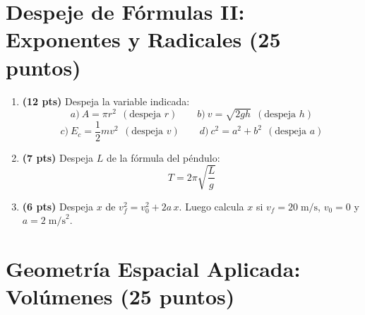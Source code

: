 \documentclass[12pt, letterpaper]{article}
\begin{document}
\newpage

\section{Despeje de Fórmulas II: Exponentes y Radicales (25 puntos)}

\begin{enumerate}[leftmargin=*]
  \item \textbf{(12 pts)} Despeja la variable indicada:
        \[
          a)\ A = \pi r^2 \ \ (\text{despeja } r) \qquad
          b)\ v = \sqrt{2gh} \ \ (\text{despeja } h)
        \]
        \[
          c)\ E_c = \frac{1}{2}mv^2 \ \ (\text{despeja } v) \qquad
          d)\ c^2 = a^2 + b^2 \ \ (\text{despeja } a)
        \]

  \item \textbf{(7 pts)} Despeja $L$ de la fórmula del péndulo:
        \[
          T = 2\pi\sqrt{\frac{L}{g}}
        \]

  \item \textbf{(6 pts)} Despeja $x$ de $v_f^2 = v_0^2 + 2a\,x$. Luego calcula $x$ si $v_f = 20\;\text{m/s}$, $v_0 = 0$ y $a = 2\;\text{m/s}^2$.
\end{enumerate}

\newpage

\section{Geometría Espacial Aplicada: Volúmenes (25 puntos)}
\end{document}
